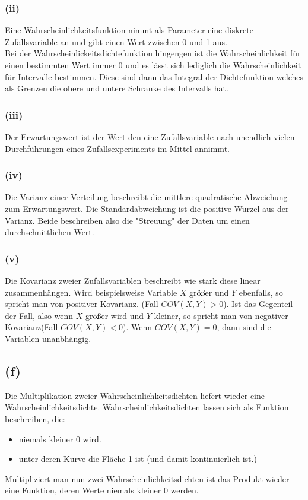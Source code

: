 \documentclass[a4paper]{scrartcl}
\begin{document}
\subsubsection*{(ii)}
Eine Wahrscheinlichkeitsfunktion nimmt als Parameter eine diskrete Zufallsvariable an und gibt einen Wert zwischen 0 und 1 aus.\\
Bei der Wahrscheinlickeitsdichtefunktion hingengen ist die Wahrscheinlichkeit für einen bestimmten Wert immer 0 und es lässt sich lediglich die Wahrscheinlichkeit für Intervalle bestimmen. Diese sind dann das Integral der Dichtefunktion welches als Grenzen die obere und untere Schranke des Intervalls hat.

\subsubsection*{(iii)} 
Der Erwartungswert ist der Wert den eine Zufallsvariable nach unendlich vielen Durchführungen eines Zufallsexperiments im Mittel annimmt.

\subsubsection*{(iv)} 
Die Varianz einer Verteilung beschreibt die mittlere quadratische Abweichung zum Erwartungswert. Die Standardabweichung ist die positive Wurzel aus der Varianz. Beide beschreiben also die "Streuung" der Daten um einen durchschnittlichen Wert.

\subsubsection*{(v)} %
Die Kovarianz zweier Zufallsvariablen beschreibt wie stark diese linear zusammenhängen. Wird beispielsweise Variable $X$ größer und $Y$ ebenfalls, so spricht man von positiver Kovarianz. (Fall $COV(X,Y)> 0$). Ist das Gegenteil der Fall, also wenn $X$ größer wird und $Y$ kleiner, so spricht man von negativer Kovarianz(Fall $COV(X,Y) < 0$). Wenn $COV(X,Y)=0$, dann sind die Variablen unanbhängig.



\subsection*{(f)}
Die Multiplikation zweier Wahrscheinlichkeitsdichten liefert wieder eine Wahrscheinlichkeitsdichte. Wahrscheinlichkeitsdichten lassen sich als Funktion beschreiben, die:
\begin{itemize}
	\item niemals kleiner 0 wird.
	\item unter deren Kurve die Fläche 1 ist (und damit kontinuierlich ist.)
\end{itemize}
Multipliziert man nun zwei Wahrscheinlichkeitsdichten ist das Produkt wieder eine Funktion, deren Werte niemals kleiner 0 werden.
\end{document}
